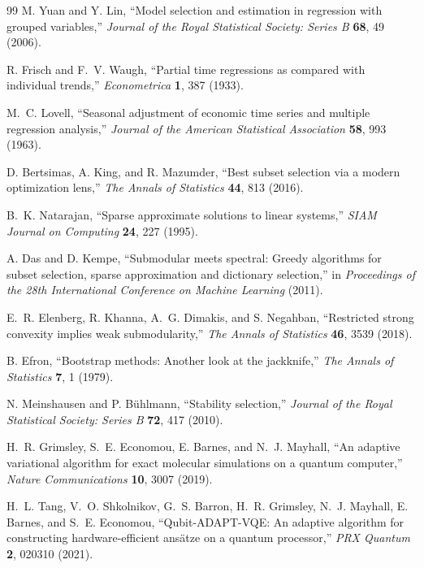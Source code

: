 \documentclass[
  reprint,
  amsmath,
  amssymb,
  aps,
  pra,
  nofootinbib,
  superscriptaddress,
  floatfix
]{revtex4-2}
\begin{document}
\begin{thebibliography}{99}
M. Yuan and Y. Lin,
``Model selection and estimation in regression with grouped variables,''
\emph{Journal of the Royal Statistical Society: Series B} \textbf{68}, 49 (2006).

R. Frisch and F.~V. Waugh,
``Partial time regressions as compared with individual trends,''
\emph{Econometrica} \textbf{1}, 387 (1933).

M.~C. Lovell,
``Seasonal adjustment of economic time series and multiple regression analysis,''
\emph{Journal of the American Statistical Association} \textbf{58}, 993 (1963).

D. Bertsimas, A. King, and R. Mazumder,
``Best subset selection via a modern optimization lens,''
\emph{The Annals of Statistics} \textbf{44}, 813 (2016).

B.~K. Natarajan,
``Sparse approximate solutions to linear systems,''
\emph{SIAM Journal on Computing} \textbf{24}, 227 (1995).

A. Das and D. Kempe,
``Submodular meets spectral: Greedy algorithms for subset selection, sparse approximation and dictionary selection,''
in \emph{Proceedings of the 28th International Conference on Machine Learning} (2011).

E.~R. Elenberg, R. Khanna, A.~G. Dimakis, and S. Negahban,
``Restricted strong convexity implies weak submodularity,''
\emph{The Annals of Statistics} \textbf{46}, 3539 (2018).

B. Efron,
``Bootstrap methods: Another look at the jackknife,''
\emph{The Annals of Statistics} \textbf{7}, 1 (1979).

N. Meinshausen and P. B\"uhlmann,
``Stability selection,''
\emph{Journal of the Royal Statistical Society: Series B} \textbf{72}, 417 (2010).

H.~R. Grimsley, S.~E. Economou, E. Barnes, and N.~J. Mayhall,
``An adaptive variational algorithm for exact molecular simulations on a quantum computer,''
\emph{Nature Communications} \textbf{10}, 3007 (2019).

H.~L. Tang, V.~O. Shkolnikov, G.~S. Barron, H.~R. Grimsley, N.~J. Mayhall, E. Barnes, and S.~E. Economou,
``Qubit-ADAPT-VQE: An adaptive algorithm for constructing hardware-efficient ans\"atze on a quantum processor,''
\emph{PRX Quantum} \textbf{2}, 020310 (2021).


\end{thebibliography}
\end{document}
